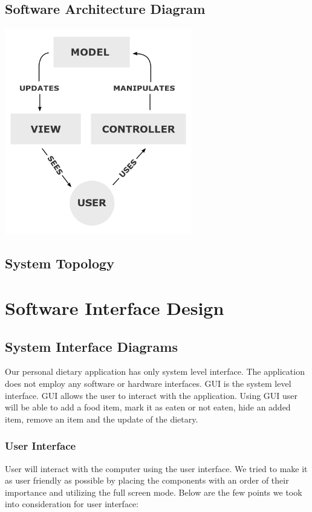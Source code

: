 \documentclass{scrreprt}
\begin{document}
\section{Software Architecture Diagram}
\includegraphics[height=9cm]{MVC-Process.png}
\section{System Topology}
\chapter{Software Interface Design}
\section{System Interface Diagrams}

Our personal dietary application has only system level interface. The application does not employ any software or hardware interfaces. GUI is the system level interface. GUI allows the user to interact with the application. Using GUI user will be able to add a food item, mark it as eaten or not eaten, hide an added item, remove an item and the update of the dietary.

\subsection{User Interface}

User will interact with the computer using the user interface. We tried to make it as user friendly as possible by placing the components with an order of their importance and utilizing the full screen mode. Below are the few points we took into consideration for user interface:
\end{document}
